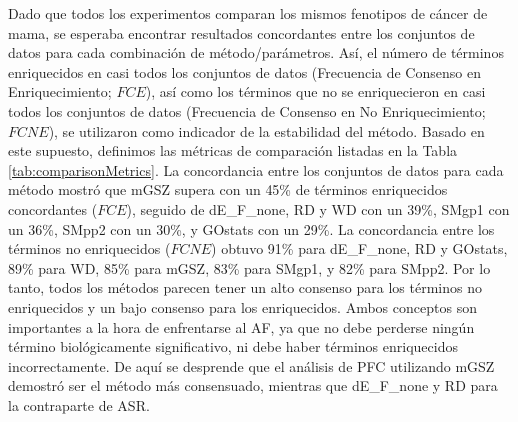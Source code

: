 \documentclass[12pt,twoside]{reedthesis}
\begin{document}
Dado que todos los experimentos comparan los mismos fenotipos de cáncer de mama, se esperaba encontrar resultados concordantes entre los conjuntos de datos para cada combinación de método/parámetros. Así, el número de términos enriquecidos en casi todos los conjuntos de datos (Frecuencia de Consenso en Enriquecimiento; \(FCE\)), así como los términos que no se enriquecieron en casi todos los conjuntos de datos (Frecuencia de Consenso en No Enriquecimiento; \(FCNE\)), se utilizaron como indicador de la estabilidad del método. Basado en este supuesto, definimos las métricas de comparación listadas en la Tabla \ref{tab:comparisonMetrics}. La concordancia entre los conjuntos de datos para cada método mostró que mGSZ supera con un 45\% de términos enriquecidos concordantes (\(FCE\)), seguido de dE\_F\_none, RD y WD con un 39\%, SMgp1 con un 36\%, SMpp2 con un 30\%, y GOstats con un 29\%. La concordancia entre los términos no enriquecidos (\(FCNE\)) obtuvo 91\% para dE\_F\_none, RD y GOstats, 89\% para WD, 85\% para mGSZ, 83\% para SMgp1, y 82\% para SMpp2. Por lo tanto, todos los métodos parecen tener un alto consenso para los términos no enriquecidos y un bajo consenso para los enriquecidos. Ambos conceptos son importantes a la hora de enfrentarse al AF, ya que no debe perderse ningún término biológicamente significativo, ni debe haber términos enriquecidos incorrectamente. De aquí se desprende que el análisis de PFC utilizando mGSZ demostró ser el método más consensuado, mientras que dE\_F\_none y RD para la contraparte de ASR.
\end{document}
